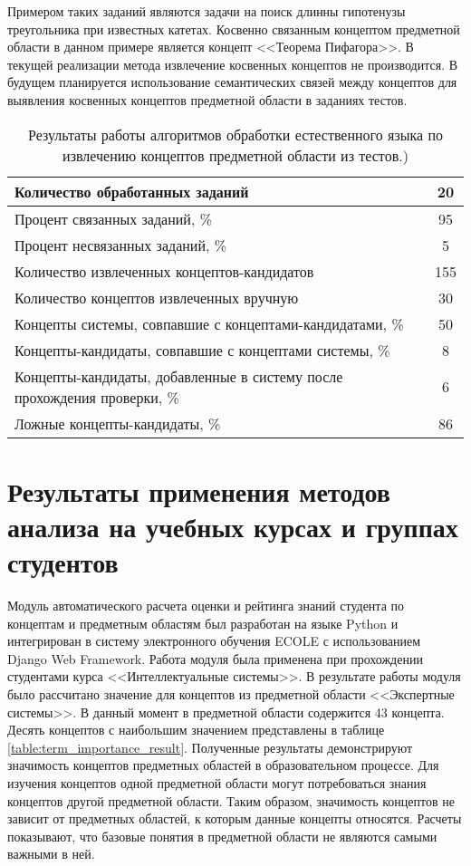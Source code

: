 Примером таких заданий являются задачи на поиск длинны гипотенузы треугольника при известных катетах. Косвенно связанным концептом предметной области в данном примере является концепт <<Теорема Пифагора>>. В текущей реализации метода извлечение косвенных концептов не производится. В будущем планируется использование семантических связей между концептов для выявления косвенных концептов предметной области в заданиях тестов.

\begin{table}[h!]
\centering
\caption{Результаты работы алгоритмов обработки естественного языка по извлечению концептов предметной области из тестов.)}
\label{table:nlp_resutls}
\begin{tabular}{ |p{12cm}|c|  }
\hline Количество обработанных заданий & 20 \\
\hline Процент связанных заданий, \% & 95 \\
\hline Процент несвязанных заданий, \% & 5 \\
\hline Количество извлеченных концептов-кандидатов & 155 \\
\hline Количество концептов извлеченных вручную & 30 \\
\hline Концепты системы, совпавшие с концептами-кандидатами, \% & 50 \\
\hline Концепты-кандидаты, совпавшие с концептами системы, \% & 8 \\
\hline Концепты-кандидаты, добавленные в систему после прохождения проверки, \%  & 6 \\
\hline Ложные концепты-кандидаты, \% & 86 \\
\hline
\end{tabular}
\end{table}  



\section{Результаты применения методов анализа на учебных курсах и группах студентов} \label{sect4_5}

Модуль автоматического расчета оценки и рейтинга знаний студента по концептам и предметным областям был разработан на языке Python и интегрирован в систему электронного обучения ECOLE с использованием Django Web Framework. Работа модуля была применена при прохождении студентами курса <<Интеллектуальные системы>>. В результате работы модуля было рассчитано значение для концептов из предметной области <<Экспертные системы>>. В данный момент в предметной области содержится 43 концепта. Десять концептов с наибольшим значением представлены в таблице \ref{table:term_importance_result}. Полученные результаты демонстрируют значимость концептов предметных областей в образовательном процессе. Для изучения концептов одной предметной области могут потребоваться знания концептов другой предметной области. Таким образом, значимость концептов не зависит от предметных областей, к которым данные концепты относятся. Расчеты показывают, что базовые понятия в предметной области не являются самыми важными в ней.    

